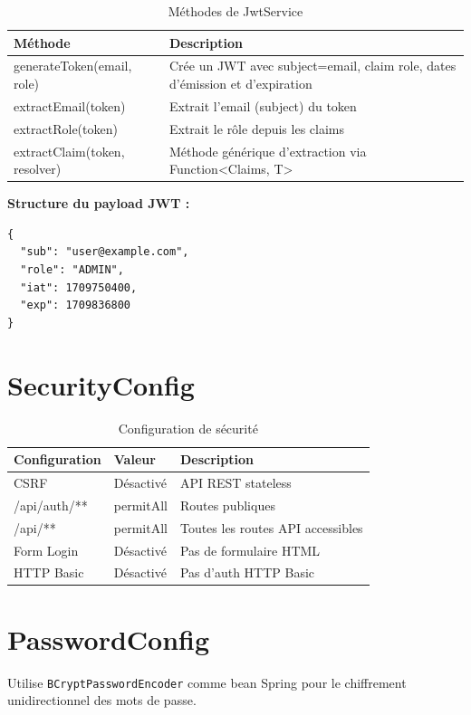 \documentclass[12pt,a4paper]{report}
\begin{document}
\begin{table}[H]
\centering
\begin{tabular}{|l|p{8cm}|}
\hline
\textbf{Méthode} & \textbf{Description} \\ \hline
generateToken(email, role) & Crée un JWT avec subject=email, claim role, dates d'émission et d'expiration \\ \hline
extractEmail(token) & Extrait l'email (subject) du token \\ \hline
extractRole(token) & Extrait le rôle depuis les claims \\ \hline
extractClaim(token, resolver) & Méthode générique d'extraction via Function<Claims, T> \\ \hline
\end{tabular}
\caption{Méthodes de JwtService}
\end{table}

\textbf{Structure du payload JWT :}
\begin{lstlisting}[caption=Payload JWT]
{
  "sub": "user@example.com",
  "role": "ADMIN",
  "iat": 1709750400,
  "exp": 1709836800
}
\end{lstlisting}

\section{SecurityConfig}

\begin{table}[H]
\centering
\begin{tabular}{|l|l|p{6cm}|}
\hline
\textbf{Configuration} & \textbf{Valeur} & \textbf{Description} \\ \hline
CSRF & Désactivé & API REST stateless \\ \hline
/api/auth/** & permitAll & Routes publiques \\ \hline
/api/** & permitAll & Toutes les routes API accessibles \\ \hline
Form Login & Désactivé & Pas de formulaire HTML \\ \hline
HTTP Basic & Désactivé & Pas d'auth HTTP Basic \\ \hline
\end{tabular}
\caption{Configuration de sécurité}
\end{table}

\section{PasswordConfig}
Utilise \texttt{BCryptPasswordEncoder} comme bean Spring pour le chiffrement unidirectionnel des mots de passe.
\end{document}
